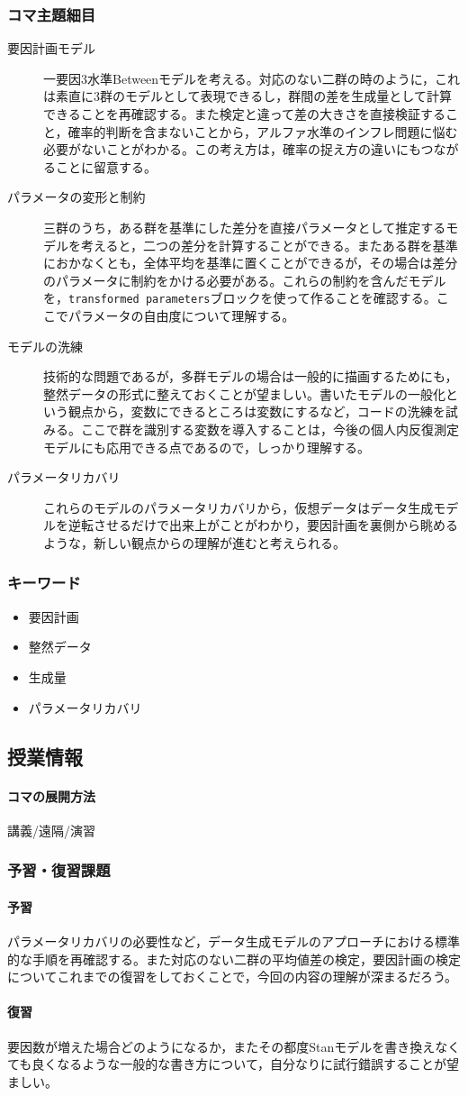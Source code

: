 \subsubsection{コマ主題細目}
\begin{description}

	\item[要因計画モデル] 一要因3水準Betweenモデルを考える。対応のない二群の時のように，これは素直に3群のモデルとして表現できるし，群間の差を生成量として計算できることを再確認する。また検定と違って差の大きさを直接検証すること，確率的判断を含まないことから，アルファ水準のインフレ問題に悩む必要がないことがわかる。この考え方は，確率の捉え方の違いにもつながることに留意する。
	\item[パラメータの変形と制約] 三群のうち，ある群を基準にした差分を直接パラメータとして推定するモデルを考えると，二つの差分を計算することができる。またある群を基準におかなくとも，全体平均を基準に置くことができるが，その場合は差分のパラメータに制約をかける必要がある。これらの制約を含んだモデルを，\verb|transformed parameters|ブロックを使って作ることを確認する。ここでパラメータの自由度について理解する。
	\item[モデルの洗練] 技術的な問題であるが，多群モデルの場合は一般的に描画するためにも，整然データの形式に整えておくことが望ましい。書いたモデルの一般化という観点から，変数にできるところは変数にするなど，コードの洗練を試みる。ここで群を識別する変数を導入することは，今後の個人内反復測定モデルにも応用できる点であるので，しっかり理解する。
	\item[パラメータリカバリ] これらのモデルのパラメータリカバリから，仮想データはデータ生成モデルを逆転させるだけで出来上がことがわかり，要因計画を裏側から眺めるような，新しい観点からの理解が進むと考えられる。

\end{description}
\subsubsection{キーワード}
\begin{itemize}
	\item 要因計画
	\item 整然データ
	\item 生成量
	\item パラメータリカバリ
\end{itemize}
\subsection{授業情報}
\paragraph{コマの展開方法}
講義/遠隔/演習
\subsubsection{予習・復習課題}
\paragraph{予習}パラメータリカバリの必要性など，データ生成モデルのアプローチにおける標準的な手順を再確認する。また対応のない二群の平均値差の検定，要因計画の検定についてこれまでの復習をしておくことで，今回の内容の理解が深まるだろう。
\paragraph{復習}要因数が増えた場合どのようになるか，またその都度Stanモデルを書き換えなくても良くなるような一般的な書き方について，自分なりに試行錯誤することが望ましい。